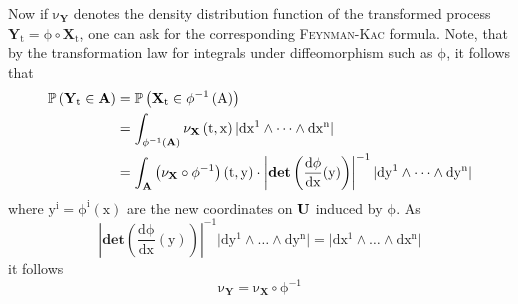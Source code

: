 \documentclass[10 pt,english]{smfart}
\newcommand{\Xt}{\mathrm{\mathbf{X}}_{t}}
\newcommand{\X}{\mathrm{\mathbf{X}}}
\newcommand{\determ}{\mathrm{\mathbf{det}}}
\newcommand{\Yt}{\mathrm{\mathbf{Y}}_{t}}
\newcommand{\Y}{\mathrm{\mathbf{Y}}}
\newcommand{\U}{{\bf{U}}}
\newcommand{\A}{{\bf{A}}}
\begin{document}
Now if $\mathrm{\nu_{\Y}}$ denotes the density distribution function of the transformed process $\mathrm{\Yt =\phi\circ \Xt}$, one can ask for the corresponding {\scshape{Feynman-Kac}} formula. Note, that by the transformation law for integrals under diffeomorphism such as $\mathrm{\phi}$, it follows that 
\begin{equation}
\begin{split}
\mathrm{\mathbb{P}\left(\Yt\in \A\right)}&=\mathrm{\mathbb{P}\left(\Xt\in \phi^{-1}\left(A\right)\right)}\\
&=\mathrm{\int_{\phi^{-1}\left(\A\right)}\nu_{\X}\left(t,x\right)\vert dx^{1}\wedge \dots\wedge dx^{n}\vert}\\
&=\mathrm{\int_{\A}\left(\nu_{\X}\circ\phi^{-1}\right)\left(t,y\right)\cdot\left\vert\determ\left(\frac{d\phi}{dx}(y)\right)\right\vert^{-1}\vert dy^{1}\wedge \dots\wedge dy^{n}\vert}\\
\end{split}
\end{equation} where $\mathrm{y^{i}=\phi^{i}\left(x\right)}$ are the new coordinates on $\mathrm{\U}$ induced by $\mathrm{\phi}$. As
\begin{equation}
\mathrm{\left\vert\determ\left(\frac{d\phi}{dx}(y)\right)\right\vert^{-1}\vert dy^{1}\wedge \dots\wedge dy^{n}\vert=\vert dx^{1}\wedge \dots\wedge dx^{n}\vert}
\end{equation} it follows 
\begin{equation}
\mathrm{\nu_{\Y}=\nu_{\X}\circ \phi^{-1}}
\end{equation}
\end{document}
